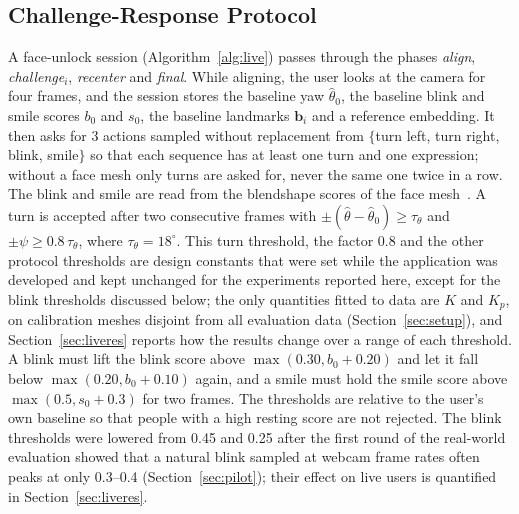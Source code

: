 \documentclass[journal]{IEEEtran}
\begin{document}
\subsection{Challenge-Response Protocol}\label{sec:protocol}
A face-unlock session (Algorithm~\ref{alg:live}) passes through the phases \emph{align}, \emph{challenge}$_i$, \emph{recenter} and \emph{final}. While aligning, the user looks at the camera for four frames, and the session stores the baseline yaw $\hat\theta_0$, the baseline blink and smile scores $b_0$ and $s_0$, the baseline landmarks $\mathbf{b}_i$ and a reference embedding. It then asks for 3 actions sampled without replacement from $\{$turn left, turn right, blink, smile$\}$ so that each sequence has at least one turn and one expression; without a face mesh only turns are asked for, never the same one twice in a row. The blink and smile are read from the blendshape scores of the face mesh~\cite{kartynnik2019facemesh}. A turn is accepted after two consecutive frames with $\pm(\hat\theta-\hat\theta_0)\ge\tau_\theta$ and $\pm\psi\ge0.8\,\tau_\theta$, where $\tau_\theta=18^\circ$. This turn threshold, the factor 0.8 and the other protocol thresholds are design constants that were set while the application was developed and kept unchanged for the experiments reported here, except for the blink thresholds discussed below; the only quantities fitted to data are $K$ and $K_p$, on calibration meshes disjoint from all evaluation data (Section~\ref{sec:setup}), and Section~\ref{sec:liveres} reports how the results change over a range of each threshold. A blink must lift the blink score above $\max(0.30,b_0+0.20)$ and let it fall below $\max(0.20,b_0+0.10)$ again, and a smile must hold the smile score above $\max(0.5,s_0+0.3)$ for two frames. The thresholds are relative to the user's own baseline so that people with a high resting score are not rejected. The blink thresholds were lowered from 0.45 and 0.25 after the first round of the real-world evaluation showed that a natural blink sampled at webcam frame rates often peaks at only 0.3--0.4 (Section~\ref{sec:pilot}); their effect on live users is quantified in Section~\ref{sec:liveres}.
\end{document}
